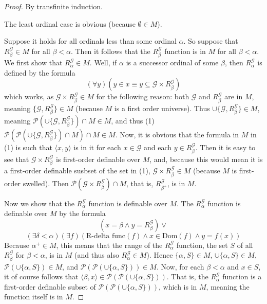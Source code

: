 \documentclass{article}
\theoremstyle{definition}
\begin{document}
\begin{proof}
By transfinite induction.

The least ordinal case is obvious (because $\emptyset\in M$).

Suppose it holds for all ordinals less than some ordinal $\alpha$. So suppose that 
$R^\mathcal{G}_\beta\in M$ for all $\beta<\alpha$. Then it follows that the 
$R^\mathcal{G}_\beta$ function is in $M$ for all $\beta<\alpha$. 
We first show that $R^\mathcal{G}_\alpha\in M$. Well, if $\alpha$ is a successor ordinal of some $\beta$, then
$R^\mathcal{G}_\alpha$ is defined by the formula
\[ (\forall y)(y\in x\equiv y\subseteq\mathcal{G}\times R^\mathcal{G}_\beta) \]
which works, as $\mathcal{G}\times R^\mathcal{G}_\beta\in M$ for the following reason:
both $\mathcal{G}$ and $R^\mathcal{G}_\beta$ are in $M$, meaning 
$\{\mathcal{G},R^\mathcal{G}_\beta\}\in M$ (because $M$ is a first order universe). Thus
$\cup\{\mathcal{G},R^\mathcal{G}_\beta\}\in M$, meaning
$\mathcal{P}(\cup\{\mathcal{G},R^\mathcal{G}_\beta\})\cap M\in M$, and thus
(1) $\mathcal{P}(\mathcal{P}(\cup\{\mathcal{G},R^\mathcal{G}_\beta\})\cap M)\cap M\in M$. Now, it is 
obvious that the formula in $M$ in (1) is such that $\langle x,y\rangle$ is in it for each 
$x\in\mathcal{G}$ and each $y\in R^\mathcal{G}_\beta$. Then it is easy to see that 
$\mathcal{G}\times R^\mathcal{G}_\beta$ is first-order definable over $M$, and, because this 
would mean it is a first-order definable susbset of the set in (1), 
$\mathcal{G}\times R^\mathcal{G}_\beta\in M$ (because $M$ is first-order swelled). Then 
$\mathcal{P}(\mathcal{G}\times R^\mathcal{G}_\beta)\cap M$, that is, 
$R^\mathcal{G}_{\beta^+}$, is in $M$.

Now we show that the $R^\mathcal{G}_\alpha$ function is definable over $M$.
The $R^\mathcal{G}_\alpha$ function is definable over $M$ by the formula
\[ (x=\beta\wedge y=R^\mathcal{G}_\beta)\vee \]
\[ (\exists\delta<\alpha)(\exists f)(\textrm{R-delta func}(f)\wedge x\in\textrm{Dom}(f)\wedge y=f(x)) \] 
Because
$\alpha^+\in M$, this means that the range of the $R^\mathcal{G}_\alpha$ function, the
set $S$ of all $R^\mathcal{G}_\beta$ for $\beta<\alpha$, is in $M$ (and thus also $R^\mathcal{G}_\alpha\in M$). Hence
$\{\alpha,S\}\in M$, $\cup\{\alpha,S\}\in M$,
$\mathcal{P}(\cup\{\alpha,S\})\in M$,
and $\mathcal{P}(\mathcal{P}(\cup\{\alpha,S\}))\in M$. Now,
for each $\beta<\alpha$ and $x\in S$, it of course follows that
$\langle \beta,x\rangle\in\mathcal{P}(\mathcal{P}(\cup\{\alpha,S\}))$. That is,
the $R^\mathcal{G}_\alpha$ function is a first-order definable subset of
$\mathcal{P}(\mathcal{P}(\cup\{\alpha,S\}))$, which is in $M$, meaning
the function itself is in $M$.


\end{proof}
\end{document}
